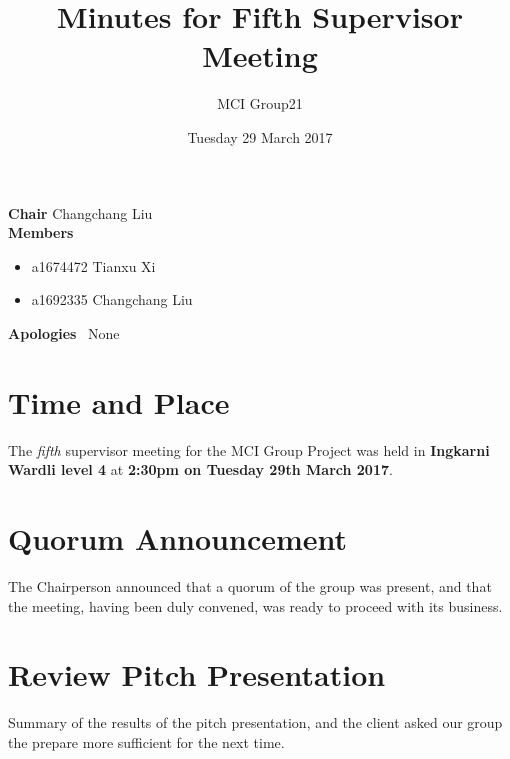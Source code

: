 \documentclass[11pt, a4paper]{article}
\begin{document}
\title{Minutes for Fifth Supervisor Meeting}
\author{MCI Group21}
\date{Tuesday 29 March 2017}
\maketitle

\vspace*{15pt}

\begin{center}
\begin{flushleft}
  \textbf{Chair}      \qquad Changchang Liu\\
  \textbf{Members}
  \begin {itemize}
  		\item a1674472 Tianxu Xi
		\item a1692335 Changchang Liu

  \end{itemize} 
  \textbf{Apologies}  \ None\\
\end{flushleft}
\end{center}




\vspace*{10pt}

\section{Time and Place}
The \emph{fifth} supervisor meeting for the MCI Group Project was held in \textbf{Ingkarni Wardli level 4} at \textbf{2:30pm on Tuesday 29th March 2017}.
 
\section{Quorum Announcement}
The Chairperson announced that a quorum of the group was present, and that the meeting, having been duly convened, was ready to proceed with its business.



\section{Review Pitch Presentation}
Summary of the results of the pitch presentation, and the client asked our group the prepare more sufficient for the next time.
\end{document}
